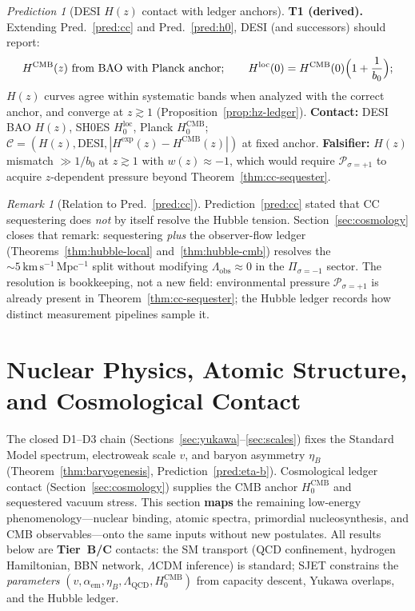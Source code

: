 \documentclass[aps,prd,onecolumn,amsmath,amssymb,nofootinbib,11pt]{revtex4-2}
\numberwithin{equation}{section}
\theoremstyle{plain}
\theoremstyle{definition}
\theoremstyle{remark}
\newtheorem{remark}[theorem]{Remark}
\newtheorem{prediction}[theorem]{Prediction}
\begin{document}
\begin{prediction}[DESI $H(z)$ contact with ledger anchors]\label{pred:hz}
\textbf{T1 (derived).} Extending Pred.~\ref{pred:cc} and Pred.~\ref{pred:h0},
DESI (and successors) should report:
\begin{equation}\label{eq:pred-hz}
  H^{\mathrm{CMB}}(z)\ \text{from BAO with Planck anchor};
  \qquad
  H^{\mathrm{loc}}(0)=H^{\mathrm{CMB}}(0)\Bigl(1+\frac{1}{b_0}\Bigr);
\end{equation}
$H(z)$ curves agree within systematic bands when analyzed with the correct
anchor, and converge at $z\gtrsim 1$ (Proposition~\ref{prop:hz-ledger}).
\textbf{Contact:} DESI BAO $H(z)$, SH0ES $H_0^{\mathrm{loc}}$,
Planck $H_0^{\mathrm{CMB}}$; $\mathcal{C}=(H(z),\mathrm{DESI},
|H^{\mathrm{exp}}(z)-H^{\mathrm{CMB}}(z)|)$ at fixed anchor.
\textbf{Falsifier:} $H(z)$ mismatch $\gg 1/b_0$ at $z\gtrsim 1$ with
$w(z)\approx -1$, which would require $\mathcal{P}_{\sigma=+1}$ to acquire
$z$-dependent pressure beyond Theorem~\ref{thm:cc-sequester}.
\end{prediction}

\begin{remark}[Relation to Pred.~\ref{pred:cc}]
Prediction~\ref{pred:cc} stated that CC sequestering does \emph{not} by itself
resolve the Hubble tension. Section~\ref{sec:cosmology} closes that remark:
sequestering \emph{plus} the observer-flow ledger (Theorems~\ref{thm:hubble-local}
and~\ref{thm:hubble-cmb}) resolves the $\sim 5\,\mathrm{km\,s^{-1}\,Mpc^{-1}}$
split without modifying $\Lambda_{\mathrm{obs}}\approx 0$ in the
$\Pi_{\sigma=-1}$ sector. The resolution is bookkeeping, not a new field:
environmental pressure $\mathcal{P}_{\sigma=+1}$ is already present in
Theorem~\ref{thm:cc-sequester}; the Hubble ledger records how distinct
measurement pipelines sample it.
\end{remark}%
\section{Nuclear Physics, Atomic Structure, and Cosmological Contact}
\label{sec:nuclear-atomic-cosmo}

The closed D1--D3 chain (Sections~\ref{sec:yukawa}--\ref{sec:scales}) fixes
the Standard Model spectrum, electroweak scale $v$, and baryon asymmetry
$\eta_B$ (Theorem~\ref{thm:baryogenesis}, Prediction~\ref{pred:eta-b}).
Cosmological ledger contact (Section~\ref{sec:cosmology}) supplies the CMB
anchor $H_0^{\mathrm{CMB}}$ and sequestered vacuum stress. This section
\textbf{maps} the remaining low-energy phenomenology---nuclear binding,
atomic spectra, primordial nucleosynthesis, and CMB observables---onto the
same inputs without new postulates. All results below are \textbf{Tier~B/C}
contacts: the SM transport (QCD confinement, hydrogen Hamiltonian, BBN network,
$\Lambda$CDM inference) is standard; SJET constrains the \emph{parameters}
$(v,\alpha_{\mathrm{em}},\eta_B,\Lambda_{\mathrm{QCD}},H_0^{\mathrm{CMB}})$
from capacity descent, Yukawa overlaps, and the Hubble ledger.
\end{document}
